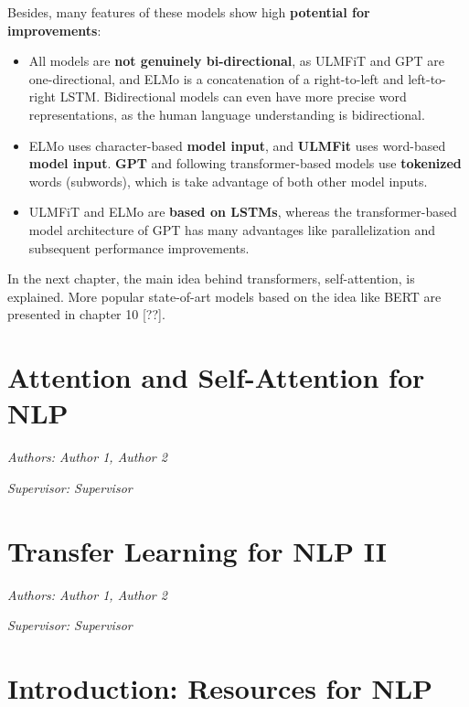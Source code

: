 \documentclass[]{krantz}
\providecommand{\tightlist}{%
  \setlength{\itemsep}{0pt}\setlength{\parskip}{0pt}}
\begin{document}
Besides, many features of these models show high \textbf{potential for improvements}:

\begin{itemize}
\tightlist
\item
  All models are \textbf{not genuinely bi-directional}, as ULMFiT and GPT are one-directional, and ELMo is a concatenation of a right-to-left and left-to-right LSTM. Bidirectional models can even have more precise word representations, as the human language understanding is bidirectional.
\item
  ELMo uses character-based \textbf{model input}, and \textbf{ULMFit} uses word-based \textbf{model input}. \textbf{GPT} and following transformer-based models use \textbf{tokenized} words (subwords), which is take advantage of both other model inputs.
\item
  ULMFiT and ELMo are \textbf{based on LSTMs}, whereas the transformer-based model architecture of GPT has many advantages like parallelization and subsequent performance improvements.
\end{itemize}

In the next chapter, the main idea behind transformers, self-attention, is explained. More popular state-of-art models based on the idea like BERT are presented in chapter 10 {[}??{]}.

\hypertarget{attention-and-self-attention-for-nlp}{%
\chapter{Attention and Self-Attention for NLP}\label{attention-and-self-attention-for-nlp}}

\emph{Authors: Author 1, Author 2}

\emph{Supervisor: Supervisor}

\hypertarget{transfer-learning-for-nlp-ii}{%
\chapter{Transfer Learning for NLP II}\label{transfer-learning-for-nlp-ii}}

\emph{Authors: Author 1, Author 2}

\emph{Supervisor: Supervisor}

\hypertarget{introduction-resources-for-nlp}{%
\chapter{Introduction: Resources for NLP}\label{introduction-resources-for-nlp}}
\end{document}
